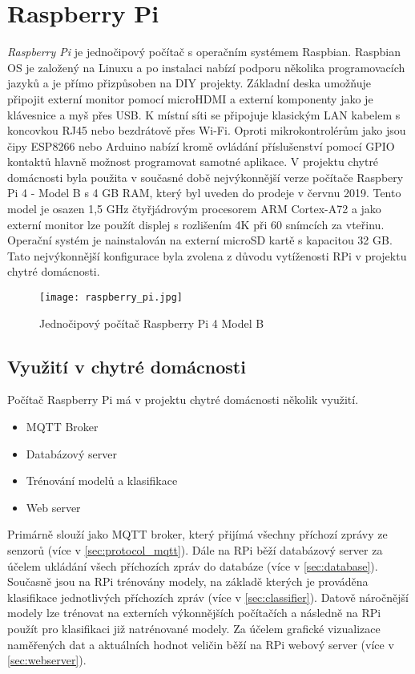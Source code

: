 \section{Raspberry Pi} \label{sec:raspberry_pi}
\textit{Raspberry Pi} je jednočipový počítač s operačním systémem Raspbian. Raspbian OS je založený na Linuxu a po instalaci nabízí podporu několika programovacích jazyků a je přímo přizpůsoben na DIY projekty. Základní deska umožňuje připojit externí monitor pomocí microHDMI a externí komponenty jako je klávesnice a myš přes USB. K místní síti se připojuje klasickým LAN kabelem s koncovkou RJ45 nebo bezdrátově přes Wi-Fi. Oproti mikrokontrolérům jako jsou čipy ESP8266 nebo Arduino nabízí kromě ovládání příslušenství pomocí GPIO kontaktů hlavně možnost programovat samotné aplikace. V projektu chytré domácnosti byla použita v současné době nejvýkonnější verze počítače Raspbery Pi 4 - Model B s 4 GB RAM, který byl uveden do prodeje v červnu 2019. Tento model je osazen 1,5 GHz čtyřjádrovým procesorem ARM Cortex-A72 a jako externí monitor lze použít displej s rozlišením 4K při 60 snímcích za vteřinu. Operační systém je nainstalován na externí microSD kartě s kapacitou 32 GB. Tato nejvýkonnější konfigurace byla zvolena z důvodu vytíženosti RPi v projektu chytré domácnosti. 

\begin{figure}[H]
  \centering
  \texttt{[image: raspberry\_pi.jpg]}
  \caption{Jednočipový počítač Raspberry Pi 4 Model B}
  \label{fig:raspberry_pi}
\end{figure} 

\subsection*{Využití v chytré domácnosti}
Počítač Raspberry Pi má v projektu chytré domácnosti několik využití. 

\begin{itemize}
  \item MQTT Broker
  \item Databázový server
  \item Trénování modelů a klasifikace
  \item Web server
\end{itemize}

Primárně slouží jako MQTT broker, který přijímá všechny příchozí zprávy ze senzorů (více v \cref{sec:protocol_mqtt}). Dále na RPi běží databázový server za účelem ukládání všech příchozích zpráv do databáze (více v \cref{sec:database}). Současně jsou na RPi trénovány modely, na základě kterých je prováděna klasifikace jednotlivých příchozích zpráv (více v \cref{sec:classifier}). Datově náročnější modely lze trénovat na externích výkonnějších počítačích a následně na RPi použít pro klasifikaci již natrénované modely. Za účelem grafické vizualizace naměřených dat a aktuálních hodnot veličin běží na RPi webový server (více v \cref{sec:webserver}). 

